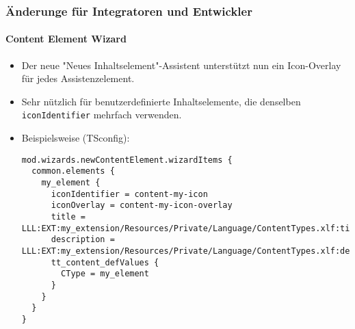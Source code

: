 %

\begin{frame}[fragile]
	\frametitle{Änderunge für Integratoren und Entwickler}
	\framesubtitle{Content Element Wizard}


	\begin{itemize}
		\item Der neue "Neues Inhaltselement"-Assistent unterstützt nun ein Icon-Overlay für
			jedes Assistenzelement.
		\item Sehr nützlich für benutzerdefinierte Inhaltselemente, die denselben
			\texttt{iconIdentifier} mehrfach verwenden.
		\item Beispielsweise (TSconfig):
\begin{lstlisting}
mod.wizards.newContentElement.wizardItems {
  common.elements {
    my_element {
      iconIdentifier = content-my-icon
      iconOverlay = content-my-icon-overlay
      title = LLL:EXT:my_extension/Resources/Private/Language/ContentTypes.xlf:title
      description = LLL:EXT:my_extension/Resources/Private/Language/ContentTypes.xlf:description
      tt_content_defValues {
        CType = my_element
      }
    }
  }
}
\end{lstlisting}

	\end{itemize}

\end{frame}

